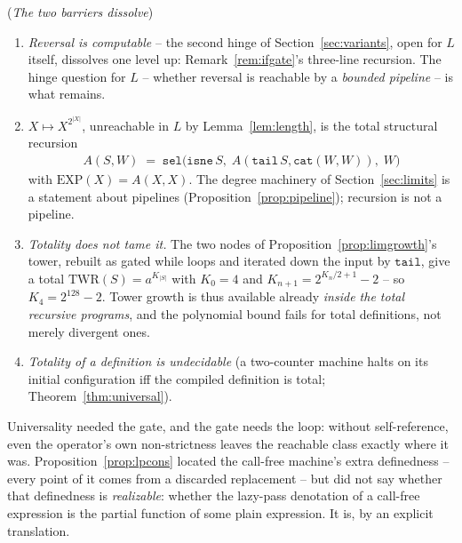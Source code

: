 \documentclass[runningheads,envcountsect]{llncs}
\begin{document}
\begin{corollary}
    (\emph{The two barriers dissolve})
    \label{cor:barriers}
    \begin{enumerate}
        \item \emph{Reversal is computable} -- the second hinge of Section~\ref{sec:variants}, open for $L$ itself, dissolves one level up: Remark~\ref{rem:ifgate}'s three-line recursion. The hinge question for $L$ -- whether reversal is reachable by a \emph{bounded pipeline} -- is what remains.
        \item $X \mapsto X^{2^{|X|}}$, unreachable in $L$ by Lemma~\ref{lem:length}, is the total structural recursion
        \begin{align}
            A(S, W) \;=\; \mathtt{sel}\big(\mathtt{isne}\,S,\; A(\mathtt{tail}\,S, \mathtt{cat}(W,W)),\; W\big)
        \end{align}
        with $\mathrm{EXP}(X) = A(X, X)$. The degree machinery of Section~\ref{sec:limits} is a statement about pipelines (Proposition~\ref{prop:pipeline}); recursion is not a pipeline.
        \item \emph{Totality does not tame it.} The two nodes of Proposition~\ref{prop:limgrowth}'s tower, rebuilt as gated while loops and iterated down the input by $\mathtt{tail}$, give a total $\mathrm{TWR}(S) = a^{K_{|S|}}$ with $K_0 = 4$ and $K_{n+1} = 2^{K_n/2+1}-2$ -- so $K_4 = 2^{128}-2$. Tower growth is thus available already \emph{inside the total recursive programs}, and the polynomial bound fails for total definitions, not merely divergent ones.
        \item \emph{Totality of a definition is undecidable} (a two-counter machine halts on its initial configuration iff the compiled definition is total; Theorem~\ref{thm:universal}).
    \end{enumerate}
\end{corollary}

Universality needed the gate, and the gate needs the loop: without self-reference, even the operator's own non-strictness leaves the reachable class exactly where it was. Proposition~\ref{prop:lpcons} located the call-free machine's extra definedness -- every point of it comes from a discarded replacement -- but did not say whether that definedness is \emph{realizable}: whether the lazy-pass denotation of a call-free expression is the partial function of some plain expression. It is, by an explicit translation.
\end{document}
